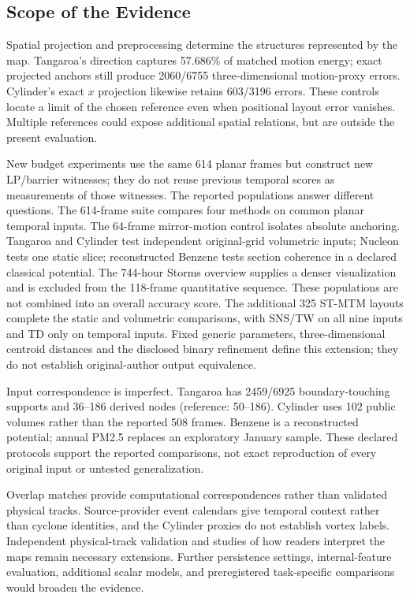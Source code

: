 \subsection{Scope of the Evidence}
Spatial projection and preprocessing determine the structures represented by the map. Tangaroa's direction captures 57.686\% of matched motion energy; exact projected anchors still produce 2060/6755 three-dimensional motion-proxy errors. Cylinder's exact $x$ projection likewise retains 603/3196 errors. These controls locate a limit of the chosen reference even when positional layout error vanishes. Multiple references could expose additional spatial relations, but are outside the present evaluation.

New budget experiments use the same 614 planar frames but construct new LP/barrier witnesses; they do not reuse previous temporal scores as measurements of those witnesses. The reported populations answer different questions. The 614-frame suite compares four methods on common planar temporal inputs. The 64-frame mirror-motion control isolates absolute anchoring. Tangaroa and Cylinder test independent original-grid volumetric inputs; Nucleon tests one static slice; reconstructed Benzene tests section coherence in a declared classical potential. The 744-hour Storms overview supplies a denser visualization and is excluded from the 118-frame quantitative sequence. These populations are not combined into an overall accuracy score. The additional 325 ST-MTM layouts complete the static and volumetric comparisons, with SNS/TW on all nine inputs and TD only on temporal inputs. Fixed generic parameters, three-dimensional centroid distances and the disclosed binary refinement define this extension; they do not establish original-author output equivalence.

Input correspondence is imperfect. Tangaroa has 2459/6925 boundary-touching supports and 36--186 derived nodes (reference: 50--186). Cylinder uses 102 public volumes rather than the reported 508 frames. Benzene is a reconstructed potential; annual PM2.5 replaces an exploratory January sample. These declared protocols support the reported comparisons, not exact reproduction of every original input or untested generalization.

Overlap matches provide computational correspondences rather than validated physical tracks. Source-provider event calendars give temporal context rather than cyclone identities, and the Cylinder proxies do not establish vortex labels. Independent physical-track validation and studies of how readers interpret the maps remain necessary extensions. Further persistence settings, internal-feature evaluation, additional scalar models, and preregistered task-specific comparisons would broaden the evidence.

